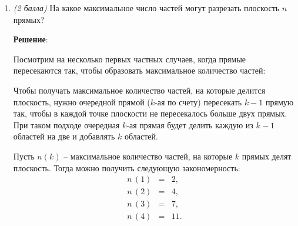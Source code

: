 \documentclass{article}
\begin{document}
\begin{enumerate}
        \item \textit{(2 балла)} На какое максимальное число частей могут разрезать плоскость $n$ прямых?
        
        \textbf{Решение}:

        Посмотрим на несколько первых частных случаев, когда прямые пересекаются так, чтобы образовать максимальное количество частей:
        \begin{center}
        \end{center}

        Чтобы получать максимальное количество частей, на которые делится плоскость, нужно очередной прямой ($k$-ая по счету) пересекать $k-1$ прямую так, чтобы в каждой точке плоскости не пересекалось больше двух прямых. При таком подходе очередная $k$-ая прямая будет делить каждую из $k-1$ областей на две  и добавлять $k$ областей.

        Пусть $n(k)$ -- максимальное количество частей, на которые $k$ прямых делят плоскость. Тогда можно получить следующую закономерность:
        \begin{eqnarray}
            n\,(1) &=& 2, \\
            n\,(2) &=& 4, \\
            n\,(3) &=& 7, \\
            n\,(4) &=& 11.
        \end{eqnarray}


\end{enumerate}
\end{document}
